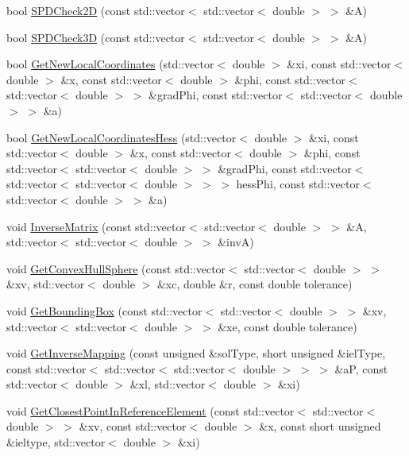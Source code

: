 \begin{DoxyCompactItemize}
\item 
bool \mbox{\hyperlink{namespacefemus_a6f129a56e82b46e93ade54d62d1e216b}{S\+P\+D\+Check2D}} (const std\+::vector$<$ std\+::vector$<$ double $>$ $>$ \&A)
\item 
bool \mbox{\hyperlink{namespacefemus_a874a88cde1f4ea068633b14801d54191}{S\+P\+D\+Check3D}} (const std\+::vector$<$ std\+::vector$<$ double $>$ $>$ \&A)
\item 
bool \mbox{\hyperlink{namespacefemus_a2be78fad3a0b3413f8e22883150153c9}{Get\+New\+Local\+Coordinates}} (std\+::vector$<$ double $>$ \&xi, const std\+::vector$<$ double $>$ \&x, const std\+::vector$<$ double $>$ \&phi, const std\+::vector$<$ std\+::vector$<$ double $>$ $>$ \&grad\+Phi, const std\+::vector$<$ std\+::vector$<$ double $>$ $>$ \&a)
\item 
bool \mbox{\hyperlink{namespacefemus_a695934883c44cf05935b730e622e0bf6}{Get\+New\+Local\+Coordinates\+Hess}} (std\+::vector$<$ double $>$ \&xi, const std\+::vector$<$ double $>$ \&x, const std\+::vector$<$ double $>$ \&phi, const std\+::vector$<$ std\+::vector$<$ double $>$ $>$ \&grad\+Phi, const std\+::vector$<$ std\+::vector$<$ std\+::vector$<$ double $>$ $>$ $>$ hess\+Phi, const std\+::vector$<$ std\+::vector$<$ double $>$ $>$ \&a)
\item 
void \mbox{\hyperlink{namespacefemus_a576a658153a52c951f9f9fca3dd054ac}{Inverse\+Matrix}} (const std\+::vector$<$ std\+::vector$<$ double $>$ $>$ \&A, std\+::vector$<$ std\+::vector$<$ double $>$ $>$ \&invA)
\item 
void \mbox{\hyperlink{namespacefemus_ac631173e3dbf1b7a766d150aca10eab1}{Get\+Convex\+Hull\+Sphere}} (const std\+::vector$<$ std\+::vector$<$ double $>$ $>$ \&xv, std\+::vector$<$ double $>$ \&xc, double \&r, const double tolerance)
\item 
void \mbox{\hyperlink{namespacefemus_ac278a2a73ea84ae1978b3c39ef49cf73}{Get\+Bounding\+Box}} (const std\+::vector$<$ std\+::vector$<$ double $>$ $>$ \&xv, std\+::vector$<$ std\+::vector$<$ double $>$ $>$ \&xe, const double tolerance)
\item 
void \mbox{\hyperlink{namespacefemus_a434f4672190f9d15cbc5e65705836bda}{Get\+Inverse\+Mapping}} (const unsigned \&sol\+Type, short unsigned \&iel\+Type, const std\+::vector$<$ std\+::vector$<$ std\+::vector$<$ double $>$ $>$ $>$ \&aP, const std\+::vector$<$ double $>$ \&xl, std\+::vector$<$ double $>$ \&xi)
\item 
void \mbox{\hyperlink{namespacefemus_a26952845941ad3ab68f35f0dc647e464}{Get\+Closest\+Point\+In\+Reference\+Element}} (const std\+::vector$<$ std\+::vector$<$ double $>$ $>$ \&xv, const std\+::vector$<$ double $>$ \&x, const short unsigned \&ieltype, std\+::vector$<$ double $>$ \&xi)

\end{DoxyCompactItemize}
